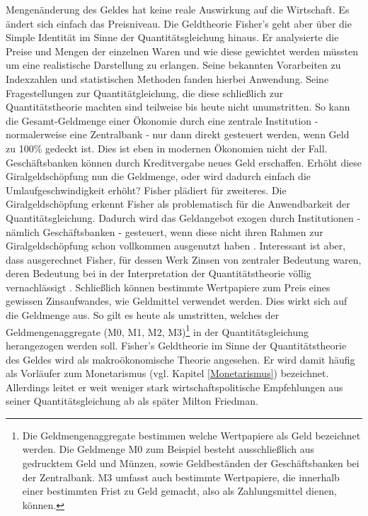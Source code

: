 Mengenänderung des Geldes hat keine reale Auswirkung auf die Wirtschaft. Es ändert sich einfach das Preisniveau. Die Geldtheorie Fisher's geht aber über die Simple Identität im Sinne der Quantitätsgleichung hinaus. Er analysierte die Preise und Mengen der einzelnen Waren und wie diese gewichtet werden müssten um eine realistische Darstellung zu erlangen. Seine bekannten Vorarbeiten zu Indexzahlen und statistischen Methoden fanden hierbei Anwendung. Seine Fragestellungen zur Quantitätgleichung, die diese schließlich zur Quantitätstheorie machten sind teilweise bis heute nicht unumstritten. So kann die Gesamt-Geldmenge einer Ökonomie durch eine zentrale Institution - normalerweise eine Zentralbank - nur dann direkt gesteuert werden, wenn Geld zu 100\% gedeckt ist. Dies ist eben in modernen Ökonomien nicht der Fall. Geschäftsbanken können durch Kreditvergabe neues Geld erschaffen. Erhöht diese Giralgeldschöpfung nun die Geldmenge, oder wird dadurch einfach die Umlaufgeschwindigkeit erhöht? Fisher plädiert für zweiteres. Die Giralgeldschöpfung erkennt Fisher als problematisch für die Anwendbarkeit der Quantitätsgleichung. Dadurch wird das Geldangebot exogen durch Institutionen - nämlich Geschäftsbanken - gesteuert, wenn diese nicht ihren Rahmen zur Giralgeldschöpfung schon vollkommen ausgenutzt haben \parencite[S. 35]{Tobin1985}. Interessant ist aber, dass ausgerechnet Fisher, für dessen Werk Zinsen \parencite{Fisher1906, Fisher1930} von zentraler Bedeutung waren, deren Bedeutung bei in der Interpretation der Quantitätstheorie völlig vernachlässigt \parencite{Tobin2005}. Schließlich können bestimmte Wertpapiere zum Preis eines gewissen Zinsaufwandes, wie Geldmittel verwendet werden. Dies wirkt sich auf die Geldmenge aus. So gilt es heute als umstritten, welches der Geldmengenaggregate (M0, M1, M2, M3)\footnote{Die Geldmengenaggregate bestimmen welche Wertpapiere als Geld bezeichnet werden. Die Geldmenge M0 zum Beispiel besteht ausschließlich aus gedrucktem Geld und Münzen, sowie Geldbeständen der Geschäftsbanken bei der Zentralbank. M3 umfasst auch bestimmte Wertpapiere, die innerhalb einer bestimmten Frist zu Geld gemacht, also als Zahlungsmittel dienen, können.} in der Quantitätsgleichung herangezogen werden soll. Fisher's Geldtheorie im Sinne der Quantitätstheorie des Geldes wird als makroökonomische Theorie angesehen. Er wird damit häufig als Vorläufer zum Monetarismus (vgl. Kapitel \ref{Monetarismus}) bezeichnet. Allerdings leitet er weit weniger stark wirtschaftspolitische Empfehlungen aus seiner Quantitätsgleichung ab als später Milton Friedman.

